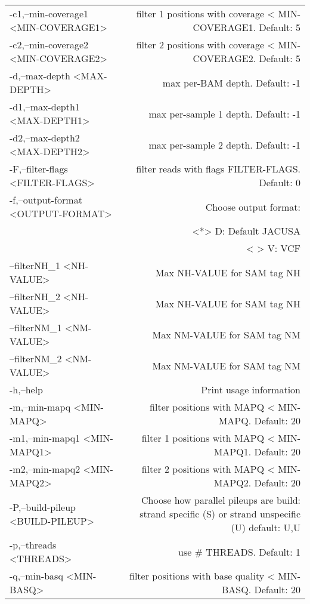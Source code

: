 \documentclass[12pt, a4paper]{article}
\begin{document}
\begin{table}
\begin{tabular}{lr}
 -c1,--min-coverage1 <MIN-COVERAGE1>            & filter 1 positions with coverage < MIN-COVERAGE1. Default: 5 \\
 -c2,--min-coverage2 <MIN-COVERAGE2>            & filter 2 positions with coverage < MIN-COVERAGE2. Default: 5 \\
 -d,--max-depth <MAX-DEPTH>                     & max per-BAM depth. Default: -1 \\
 -d1,--max-depth1 <MAX-DEPTH1>                  & max per-sample 1 depth. Default: -1 \\
 -d2,--max-depth2 <MAX-DEPTH2>                  & max per-sample 2 depth. Default: -1 \\
 -F,--filter-flags <FILTER-FLAGS>               & filter reads with flags FILTER-FLAGS. Default: 0 \\
 -f,--output-format <OUTPUT-FORMAT>             & Choose output format: \\
                                                & <*> D: Default JACUSA \\
                                                & < > V: VCF \\
    --filterNH\_1 <NH-VALUE>                    & Max NH-VALUE for SAM tag NH \\
    --filterNH\_2 <NH-VALUE>                    & Max NH-VALUE for SAM tag NH \\
    --filterNM\_1 <NM-VALUE>                    & Max NM-VALUE for SAM tag NM \\
    --filterNM\_2 <NM-VALUE>                    & Max NM-VALUE for SAM tag NM \\
 -h,--help                                      & Print usage information \\
 -m,--min-mapq <MIN-MAPQ>                       & filter positions with MAPQ < MIN-MAPQ. Default: 20 \\
 -m1,--min-mapq1 <MIN-MAPQ1>                    & filter 1 positions with MAPQ < MIN-MAPQ1. Default: 20 \\
 -m2,--min-mapq2 <MIN-MAPQ2>                    & filter 2 positions with MAPQ < MIN-MAPQ2. Default: 20 \\
 -P,--build-pileup <BUILD-PILEUP>               & Choose how parallel pileups are build: strand specific (S) or strand unspecific (U) default: U,U \\
 -p,--threads <THREADS>                         & use \# THREADS. Default: 1 \\
 -q,--min-basq <MIN-BASQ>                       & filter positions with base quality < MIN-BASQ. Default: 20 \\

\end{tabular}
\end{table}
\end{document}
